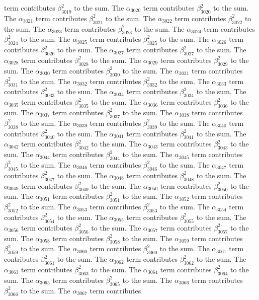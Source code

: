 \begin{lemma}
term contributes $\beta_{3019}^{2}$ to the sum. The $\alpha_{3020}$ term contributes $\beta_{3020}^{2}$ to the sum. The $\alpha_{3021}$ term contributes $\beta_{3021}^{2}$ to the sum. The $\alpha_{3022}$ term contributes $\beta_{3022}^{2}$ to the sum. The $\alpha_{3023}$ term contributes $\beta_{3023}^{2}$ to the sum. The $\alpha_{3024}$ term contributes $\beta_{3024}^{2}$ to the sum. The $\alpha_{3025}$ term contributes $\beta_{3025}^{2}$ to the sum. The $\alpha_{3026}$ term contributes $\beta_{3026}^{2}$ to the sum. The $\alpha_{3027}$ term contributes $\beta_{3027}^{2}$ to the sum. The $\alpha_{3028}$ term contributes $\beta_{3028}^{2}$ to the sum. The $\alpha_{3029}$ term contributes $\beta_{3029}^{2}$ to the sum. The $\alpha_{3030}$ term contributes $\beta_{3030}^{2}$ to the sum. The $\alpha_{3031}$ term contributes $\beta_{3031}^{2}$ to the sum. The $\alpha_{3032}$ term contributes $\beta_{3032}^{2}$ to the sum. The $\alpha_{3033}$ term contributes $\beta_{3033}^{2}$ to the sum. The $\alpha_{3034}$ term contributes $\beta_{3034}^{2}$ to the sum. The $\alpha_{3035}$ term contributes $\beta_{3035}^{2}$ to the sum. The $\alpha_{3036}$ term contributes $\beta_{3036}^{2}$ to the sum. The $\alpha_{3037}$ term contributes $\beta_{3037}^{2}$ to the sum. The $\alpha_{3038}$ term contributes $\beta_{3038}^{2}$ to the sum. The $\alpha_{3039}$ term contributes $\beta_{3039}^{2}$ to the sum. The $\alpha_{3040}$ term contributes $\beta_{3040}^{2}$ to the sum. The $\alpha_{3041}$ term contributes $\beta_{3041}^{2}$ to the sum. The $\alpha_{3042}$ term contributes $\beta_{3042}^{2}$ to the sum. The $\alpha_{3043}$ term contributes $\beta_{3043}^{2}$ to the sum. The $\alpha_{3044}$ term contributes $\beta_{3044}^{2}$ to the sum. The $\alpha_{3045}$ term contributes $\beta_{3045}^{2}$ to the sum. The $\alpha_{3046}$ term contributes $\beta_{3046}^{2}$ to the sum. The $\alpha_{3047}$ term contributes $\beta_{3047}^{2}$ to the sum. The $\alpha_{3048}$ term contributes $\beta_{3048}^{2}$ to the sum. The $\alpha_{3049}$ term contributes $\beta_{3049}^{2}$ to the sum. The $\alpha_{3050}$ term contributes $\beta_{3050}^{2}$ to the sum. The $\alpha_{3051}$ term contributes $\beta_{3051}^{2}$ to the sum. The $\alpha_{3052}$ term contributes $\beta_{3052}^{2}$ to the sum. The $\alpha_{3053}$ term contributes $\beta_{3053}^{2}$ to the sum. The $\alpha_{3054}$ term contributes $\beta_{3054}^{2}$ to the sum. The $\alpha_{3055}$ term contributes $\beta_{3055}^{2}$ to the sum. The $\alpha_{3056}$ term contributes $\beta_{3056}^{2}$ to the sum. The $\alpha_{3057}$ term contributes $\beta_{3057}^{2}$ to the sum. The $\alpha_{3058}$ term contributes $\beta_{3058}^{2}$ to the sum. The $\alpha_{3059}$ term contributes $\beta_{3059}^{2}$ to the sum. The $\alpha_{3060}$ term contributes $\beta_{3060}^{2}$ to the sum. The $\alpha_{3061}$ term contributes $\beta_{3061}^{2}$ to the sum. The $\alpha_{3062}$ term contributes $\beta_{3062}^{2}$ to the sum. The $\alpha_{3063}$ term contributes $\beta_{3063}^{2}$ to the sum. The $\alpha_{3064}$ term contributes $\beta_{3064}^{2}$ to the sum. The $\alpha_{3065}$ term contributes $\beta_{3065}^{2}$ to the sum. The $\alpha_{3066}$ term contributes $\beta_{3066}^{2}$ to the sum. The $\alpha_{3067}$ term contributes 
\end{lemma}

